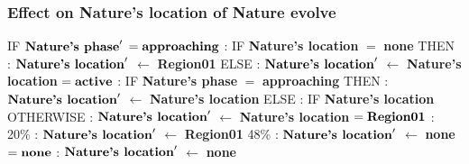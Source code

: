 \documentclass{article}%
\begin{document}
\subsubsection{Effect on Nature's location of Nature evolve}%
\label{ssubsec:Effect on Nature's location of Nature evolve}%
\begin{flushleft}%
IF %
$\mbox{\textbf{Nature's phase}} '$%
\linebreak%
\hspace*{2em}%
$= \mbox{\textbf{approaching}}$%
: %
IF %
\textbf{Nature's location}%
$=$%
\textbf{none}%
\linebreak%
\hspace*{4em}%
THEN %
: %
$\mbox{\textbf{Nature's location}} '$%
$\leftarrow$%
\textbf{Region01}%
\linebreak%
\hspace*{4em}%
ELSE %
: %
$\mbox{\textbf{Nature's location}} '$%
$\leftarrow$%
\textbf{Nature's location}%
\linebreak%
\hspace*{2em}%
$= \mbox{\textbf{active}}$%
: %
IF %
\textbf{Nature's phase}%
$=$%
\textbf{approaching}%
\linebreak%
\hspace*{4em}%
THEN %
: %
$\mbox{\textbf{Nature's location}} '$%
$\leftarrow$%
\textbf{Nature's location}%
\linebreak%
\hspace*{4em}%
ELSE %
: %
IF %
\textbf{Nature's location}%
\linebreak%
\hspace*{6em}%
OTHERWISE %
: %
$\mbox{\textbf{Nature's location}} '$%
$\leftarrow$%
\textbf{Nature's location}%
\linebreak%
\hspace*{6em}%
$= \mbox{\textbf{Region01}}$%
: %
\linebreak%
\hspace*{8em}%
20\%%
: %
$\mbox{\textbf{Nature's location}} '$%
$\leftarrow$%
\textbf{Region01}%
\linebreak%
\hspace*{8em}%
48\%%
: %
$\mbox{\textbf{Nature's location}} '$%
$\leftarrow$%
\textbf{none}%
\linebreak%
\hspace*{2em}%
$= \mbox{\textbf{none}}$%
: %
$\mbox{\textbf{Nature's location}} '$%
$\leftarrow$%
\textbf{none}%
\end{flushleft}

%
\end{document}

